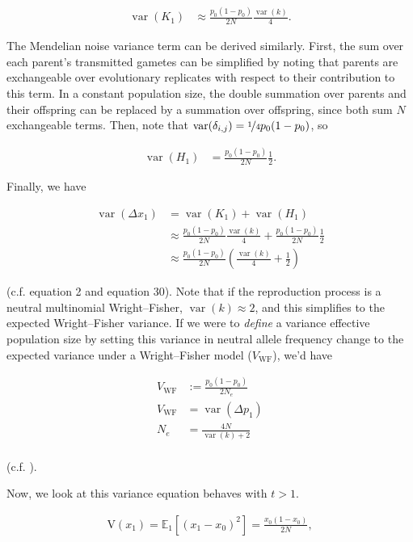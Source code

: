 \documentclass[11pt]{article}
\newcommand{\E}{\mathbb{E}}
\newcommand{\V}{\text{V}}
\DeclareMathOperator{\var}{var}
\begin{document}
\begin{align}
  \var(K_1) &\approx \frac{p_0(1-p_0)}{2N} \frac{\var(k)}{4}.
\end{align}

The Mendelian noise variance term can be derived similarly. First, the sum over
each parent's transmitted gametes can be simplified by noting that parents are
exchangeable over evolutionary replicates with respect to their contribution to
this term. In a constant population size, the double summation over parents and
their offspring can be replaced by a summation over offspring, since both sum
$N$ exchangeable terms. Then, note that $\var(\delta_{i,j}) = \nicefrac{1}{4}
p_0(1-p_0)$, so

\begin{align}
  \var(H_1) &= \frac{p_0(1-p_0)}{2N} \frac{1}{2}.
\end{align}

Finally, we have

\begin{align}
  \var(\Delta x_1) &= \var(K_1) + \var(H_1) \\
  &\approx \frac{p_0(1-p_0)}{2N} \frac{\var(k)}{4} + \frac{p_0(1-p_0)}{2N} \frac{1}{2} \\
                   &\approx \frac{p_0(1-p_0)}{2N}\left(\frac{\var(k)}{4} + \frac{1}{2}\right)
\end{align}

(c.f. \cite{Santiago1995-hx} equation 2 and \cite{Buffalo2019-qs} equation 30).
Note that if the reproduction process is a neutral multinomial Wright--Fisher,
$\var(k) \approx 2$, and this simplifies to the expected Wright--Fisher
variance. If we were to \emph{define} a variance effective population size by
setting this variance in neutral allele frequency change to the expected
variance under a Wright--Fisher model ($V_\text{WF}$), we'd have

\begin{align}
  V_\text{WF} &:= \frac{p_0(1-p_0)}{2N_e} \\
  V_\text{WF} &= \var(\Delta p_1) \\
  N_e &= \frac{4N}{\var(k) + 2} \\
\end{align}

(c.f. \cite{Wright1938-tv}).

Now, we look at this variance equation behaves with $t > 1$. 

\begin{align}
  \V(x_1) = \E_1\left[(x_1 - x_0)^2\right]= \frac{x_0(1-x_0)}{2N},
\end{align}
\end{document}
